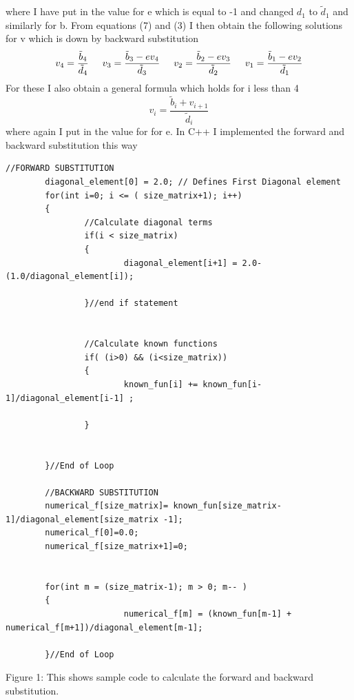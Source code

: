 \documentclass[11pt,a4wide]{article}
\begin{document}
where I have put in the value for e which is equal to -1 and changed $d_1$ to $\tilde{d}_1$ and similarly for b. From equations (7)
and (3) I then obtain the following solutions for v which is down by backward substitution
\begin{equation}
 	v_4 =\frac{\tilde{b}_4}{\tilde{d}_4} \hspace{0.5cm} v_3 =\frac{\tilde{b}_3 -ev_4}{\tilde{d}_3} \hspace{0.5cm} 			  
	v_2=\frac{\tilde{b}_2 -ev_3}{\tilde{d}_2} \hspace{0.5cm} v_1 =\frac{\tilde{b}_1 -ev_2}{\tilde{d}_1}
\end{equation}
For these I also obtain a general formula which holds for i less than 4
\begin{equation}
	v_i =\frac{\tilde{b}_i + v_{i+1}}{\tilde{d}_i}
\end{equation}
where again I put in the value for for e. In C++ I implemented the forward and backward substitution this way 
 
\begin{lstlisting}[title={Project1}]
        //FORWARD SUBSTITUTION
        diagonal_element[0] = 2.0; // Defines First Diagonal element    
        for(int i=0; i <= ( size_matrix+1); i++)
        {
                //Calculate diagonal terms
                if(i < size_matrix)
                {
                        diagonal_element[i+1] = 2.0-(1.0/diagonal_element[i]);

                }//end if statement


                //Calculate known functions
                if( (i>0) && (i<size_matrix))
                {
                        known_fun[i] += known_fun[i-1]/diagonal_element[i-1] ;

                }


        }//End of Loop
        
        //BACKWARD SUBSTITUTION 
        numerical_f[size_matrix]= known_fun[size_matrix-1]/diagonal_element[size_matrix -1];
        numerical_f[0]=0.0;
        numerical_f[size_matrix+1]=0;


        for(int m = (size_matrix-1); m > 0; m-- )
        {
                        numerical_f[m] = (known_fun[m-1] + numerical_f[m+1])/diagonal_element[m-1];

        }//End of Loop
\end{lstlisting}
\begin{center}
Figure 1: This shows sample code to calculate the forward and backward substitution.
\end{center}
\end{document}
